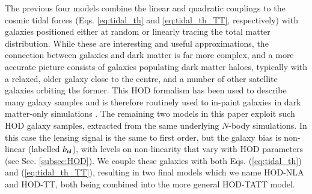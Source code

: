 The previous four models combine the linear and quadratic couplings to the cosmic tidal forces  (Eqs. \ref{eq:tidal_th} and \ref{eq:tidal_th_TT}, respectively) with galaxies positioned  either at random or linearly tracing the total matter distribution.
While these are interesting and useful approximations, the connection between galaxies and dark matter is far more complex, and a more accurate picture consists of galaxies populating dark matter haloes, typically with a relaxed, older galaxy close to the centre, and a number of other satellite galaxies orbiting the former.
This HOD formalism has been used to describe many galaxy samples \citep[\eg][]{SDSS-HOD, BOSS-HOD, GAMA-HOD, DESI-HOD} and is therefore routinely used to in-paint galaxies in dark matter-only simulations \citep{MICE-HOD, SLICS-HOD,  Abbacus-HOD, Balrog}.
The remaining two models in this paper exploit such HOD galaxy samples, extracted from the same underlying $N$-body simulations. In this case the lensing signal is the same to first order, but the galaxy bias is non-linear (labelled $b_{\rm nl}$), with levels on non-linearity that vary with HOD parameters (see Sec. \ref{subsec:HOD}).
We couple these galaxies with both Eqs. (\ref{eq:tidal_th}) and (\ref{eq:tidal_th_TT}), resulting in two final models which we name  HOD-NLA and  HOD-TT, both being combined into the more general  HOD-TATT model.




